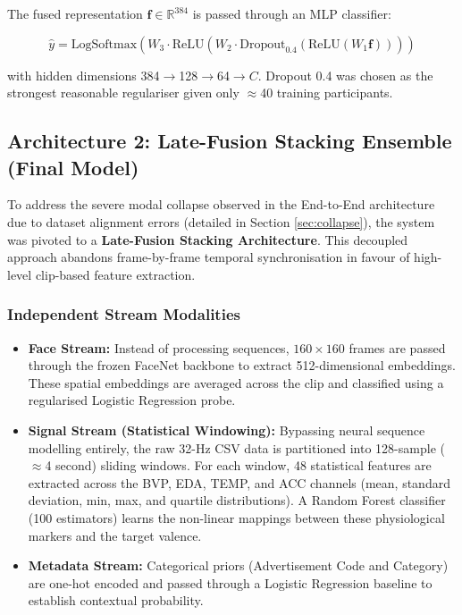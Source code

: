 \documentclass[12pt, a4paper]{article}
\begin{document}
The fused representation $\mathbf{f} \in \mathbb{R}^{384}$ is passed through an MLP classifier:

\begin{equation}
    \hat{y} = \text{LogSoftmax}\!\left(W_3 \cdot \text{ReLU}(W_2 \cdot \text{Dropout}_{0.4}(\text{ReLU}(W_1 \mathbf{f})))\right)
\end{equation}

with hidden dimensions 384$\rightarrow$128$\rightarrow$64$\rightarrow C$. Dropout 0.4 was chosen as the strongest reasonable regulariser given only $\approx$40 training participants.

\subsection{Architecture 2: Late-Fusion Stacking Ensemble (Final Model)}

To address the severe modal collapse observed in the End-to-End architecture due to dataset alignment errors (detailed in Section \ref{sec:collapse}), the system was pivoted to a \textbf{Late-Fusion Stacking Architecture}. This decoupled approach abandons frame-by-frame temporal synchronisation in favour of high-level clip-based feature extraction.

\subsubsection{Independent Stream Modalities}

\begin{itemize}
    \item \textbf{Face Stream:} Instead of processing sequences, $160 \times 160$ frames are passed through the frozen FaceNet backbone to extract 512-dimensional embeddings. These spatial embeddings are averaged across the clip and classified using a regularised Logistic Regression probe.
    \item \textbf{Signal Stream (Statistical Windowing):} Bypassing neural sequence modelling entirely, the raw 32-Hz CSV data is partitioned into 128-sample ($\approx$4 second) sliding windows. For each window, 48 statistical features are extracted across the BVP, EDA, TEMP, and ACC channels (mean, standard deviation, min, max, and quartile distributions). A Random Forest classifier (100 estimators) learns the non-linear mappings between these physiological markers and the target valence.
    \item \textbf{Metadata Stream:} Categorical priors (Advertisement Code and Category) are one-hot encoded and passed through a Logistic Regression baseline to establish contextual probability.
\end{itemize}
\end{document}
